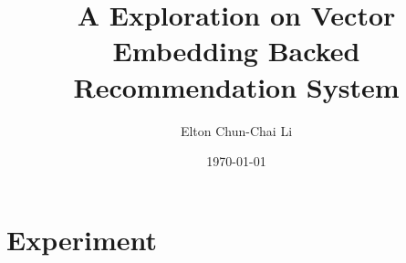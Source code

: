 \documentclass[11pt]{article}
\title{A Exploration on Vector Embedding Backed Recommendation System}
\author{Elton Chun-Chai Li}
\date{\today}
\theoremstyle{definition}
\begin{document}
\maketitle

\tableofcontents

\clearpage

\part{Experiment}





\clearpage
\end{document}
